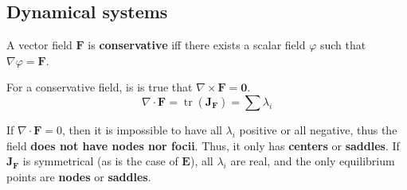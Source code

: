 \documentclass{form}
\newcommand{\matr}[1]{\mathbf{#1}} %
\DeclareMathOperator{\tr}{tr}
\begin{document}
\begin{multicols}{2}
\section*{Dynamical systems}
A vector field $\mathbf{F}$ is \textbf{conservative} iff there exists a scalar field $\varphi$ such that $\nabla \varphi = \mathbf{F}$. \par
For a conservative field, is is true that $\nabla \times \mathbf{F} = \mathbf{0}$.
\begin{equation*}
\nabla \cdot \mathbf{F} = \tr(\matr{J}_{\mathbf{F}}) = \sum{\lambda_i}
\end{equation*}\par
If $\nabla \cdot \mathbf{F}=0$, then it is impossible to have all $\lambda_i$ positive or all negative, thus the field \textbf{does not have nodes nor focii}.
Thus, it only has \textbf{centers} or \textbf{saddles}.
If $\matr{J}_\mathbf{F}$ is symmetrical (as is the case of $\mathbf{E}$), all $\lambda_i$ are real, and the only equilibrium points are \textbf{nodes} or \textbf{saddles}.
\end{multicols}
\end{document}
